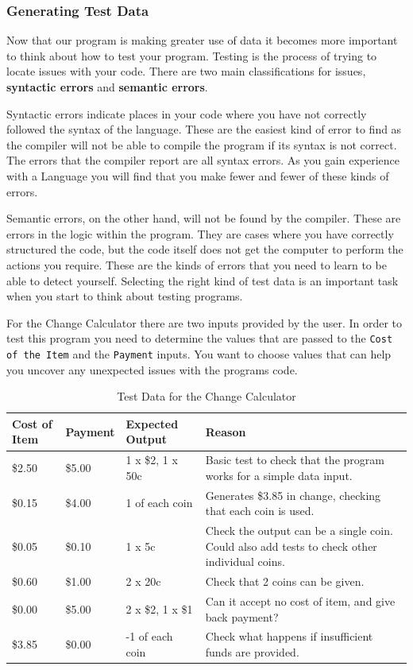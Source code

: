 \clearpage
\subsubsection{Generating Test Data} %
\label{ssub:generating_test_data}

Now that our program is making greater use of data it becomes more important to think about how to test your program. Testing is the process of trying to locate issues with your code. There are two main classifications for issues, \textbf{syntactic errors} and \textbf{semantic errors}.

Syntactic errors indicate places in your code where you have not correctly followed the syntax of the language. These are the easiest kind of error to find as the compiler will not be able to compile the program if its syntax is not correct. The errors that the compiler report are all syntax errors. As you gain experience with a Language you will find that you make fewer and fewer of these kinds of errors. 

Semantic errors, on the other hand, will not be found by the compiler. These are errors in the logic within the program. They are cases where you have correctly structured the code, but the code itself does not get the computer to perform the actions you require. These are the kinds of errors that you need to learn to be able to detect yourself. Selecting the right kind of test data is an important task when you start to think about testing programs.

For the Change Calculator there are two inputs provided by the user. In order to test this program you need to determine the values that are passed to the \texttt{Cost of the Item} and the \texttt{Payment} inputs. You want to choose values that can help you uncover any unexpected issues with the programs code.

\begin{table}[htbp]
\begin{tabular}{|l|l|l|p{7cm}|}
  \hline
  \textbf{Cost of Item}  & \textbf{Payment} & \textbf{Expected Output}  &   \textbf{Reason} \\
  \hline
  \$2.50 & \$5.00 & 1 x \$2, 1 x 50c & Basic test to check that the program works for a simple data input. \\
  \hline
  \$0.15 & \$4.00 & 1 of each coin & Generates \$3.85 in change, checking that each coin is used. \\
  \hline
  \$0.05 & \$0.10 & 1 x 5c & Check the output can be a single coin. Could also add tests to check other individual coins. \\
  \hline
  \$0.60 & \$1.00 & 2 x 20c & Check that 2 coins can be given. \\
  \hline
  \$0.00 & \$5.00 & 2 x \$2, 1 x \$1 & Can it accept no cost of item, and give back payment? \\
  \hline
  \$3.85 & \$0.00 & -1 of each coin & Check what happens if insufficient funds are provided. \\
  \hline
\end{tabular}
\caption{Test Data for the Change Calculator}
\label{tab:simple_change_test_data}
\end{table}

